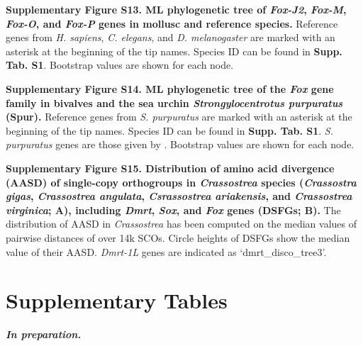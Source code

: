 \documentclass[../main.tex]{subfiles}
\begin{document}
{    \vspace{5mm}

    \noindent\textbf{Supplementary Figure S13. ML phylogenetic tree of \textit{Fox-J2}, \textit{Fox-M}, \textit{Fox-O}, and \textit{Fox-P} genes in mollusc and reference species.} Reference genes from \textit{H. sapiens}, \textit{C. elegans}, and \textit{D. melanogaster} are marked with an asterisk at the beginning of the tip names. Species ID can be found in \textbf{Supp. Tab. S1}. Bootstrap values are shown for each node.

    \vspace{5mm}

    \noindent\textbf{Supplementary Figure S14. ML phylogenetic tree of the \textit{Fox} gene family in bivalves and the sea urchin \textit{Strongylocentrotus purpuratus} (Spur).} Reference genes from \textit{S. purpuratus} are marked with an asterisk at the beginning of the tip names. Species ID can be found in \textbf{Supp. Tab. S1}. \textit{S. purpuratus} genes are those given by \textbf{\cite{tu2006sea}}. Bootstrap values are shown for each node.

    \vspace{5mm}
    
    \noindent\textbf{Supplementary Figure S15. Distribution of amino acid divergence (AASD) of single-copy orthogroups in \textit{Crassostrea} species (\textit{Crassostra gigas}, \textit{Crassostrea angulata}, \textit{Csrassostrea ariakensis}, and \textit{Crassostrea virginica}; A), including \textit{Dmrt}, \textit{Sox}, and \textit{Fox} genes (DSFGs; B).} The distribution of AASD in \textit{Crassostrea} has been computed on the median values of pairwise distances of over 14k SCOs. Circle heights of DSFGs show the median value of their AASD. \textit{Dmrt-1L} genes are indicated as ‘dmrt\_disco\_tree3’.
}

\section*{Supplementary Tables}

\textbf{\textit{In preparation.}}
\end{document}
